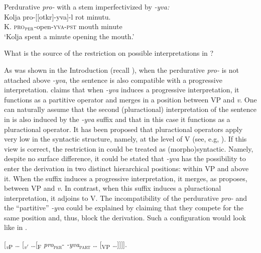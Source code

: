 \documentclass[output=paper,
]{langscibook}
\begin{document}
    \ea Perdurative \textit{pro-} with a stem imperfectivized by         \textit{-yva:}\label{ex:naumov:9}\smallskip\\
    \gll Kolja 	pro-[[otkr]-yva]-l 		rot 		minutu.\\  
     K. \textsc{pro}$_\textsc{per}$-open-\textsc{yva}-\textsc{pst} mouth 		minute\\ 
    \glt `Kolja spent a minute opening the mouth.'
\z\z 

\noindent What is the source of the restriction on possible interpretations in ?

As was shown in the Introduction (recall ), when the perdurative \textit{pro-} is not attached above  \textit{-yva}, the sentence is also compatible with a progressive interpretation. \citet{tatevosov2015severing} claims that when \textit{-yva} induces a progressive interpretation, it functions as a partitive operator and merges in a position between VP and \textit{v}. One can naturally assume that the second (pluractional) interpretation of the sentence in  is also induced by the \textit{-yva} suffix and that in this case it functions as a pluractional operator. It has been proposed that pluractional operators apply very low in the syntactic structure, namely, at the level of V (see, e.g, \citealt{lasersohn1995plurality,van2004adverbials}). If this view is correct, the restriction in  could be treated as (morpho)syntactic. Namely, despite no surface difference, it could be stated that \textit{-yva} has the possibility to enter the derivation in two distinct hierarchical positions: within VP and above it. When the suffix induces a progressive interpretation, it merges, as \citet{tatevosov2015severing} proposes, between VP and \textit{v}. In contrast, when this suffix induces a pluractional interpretation, it adjoins to V. The incompatibility of the perdurative \textit{pro-} and the ``partitive'' \textit{-yva} could be explained by claiming that they compete for the same position and, thus, block the derivation. Such a configuration would look like in . 

\ea \label{ex:naumov:10}
{[\textsubscript{\textit{v}P} {\ldots} [\textsubscript{\textit{v}$'$} \ldots [\textsubscript{F} \textit{pro}\textsubscript{\textsc{per}}- \textit{-yva}\textsubscript{\textsc{part}} {\ldots} [\textsubscript{VP} {\ldots}]]]].}
\z
\end{document}
